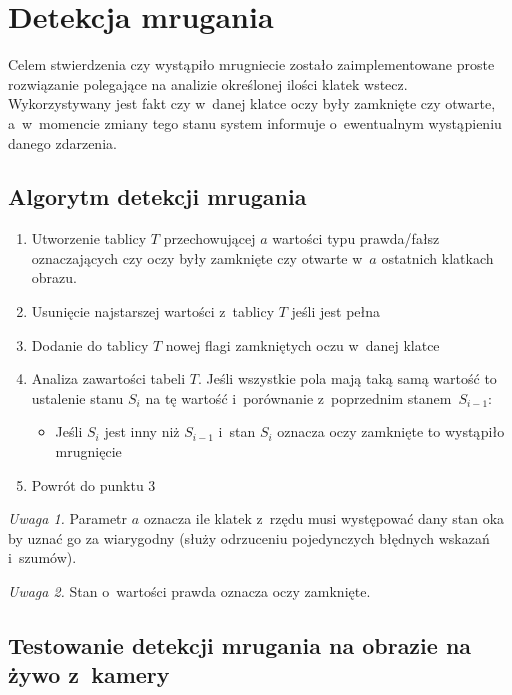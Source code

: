 \newpage

\section{Detekcja mrugania}

Celem stwierdzenia czy wystąpiło mrugniecie zostało zaimplementowane proste rozwiązanie polegające na analizie określonej ilości klatek wstecz. Wykorzystywany jest fakt czy w~danej klatce oczy były zamknięte czy otwarte, a~w~momencie zmiany tego stanu system informuje o~ewentualnym wystąpieniu danego zdarzenia. 

\subsection{Algorytm detekcji mrugania}

\begin{enumerate}
    \item Utworzenie tablicy $T$ przechowującej $a$ wartości typu prawda/fałsz oznaczających czy oczy były zamknięte czy otwarte w~$a$ ostatnich klatkach obrazu.
    \item Usunięcie najstarszej wartości z~tablicy $T$ jeśli jest pełna
    \item Dodanie do tablicy $T$ nowej flagi zamkniętych oczu w~danej klatce
    \item Analiza zawartości tabeli $T$. Jeśli wszystkie pola mają taką samą wartość to ustalenie stanu $S_{i}$ na tę wartość i~porównanie z~poprzednim stanem~$S_{i-1}$:
        \begin{itemize}
            \item Jeśli $S_{i}$ jest inny niż $S_{i-1}$ i~stan $S_{i}$ oznacza oczy zamknięte to wystąpiło mrugnięcie
        \end{itemize}
    \item Powrót do punktu 3
\end{enumerate}

\vspace{3mm}

\textit{Uwaga 1.} Parametr $a$ oznacza ile klatek z~rzędu musi występować dany stan oka by uznać go za wiarygodny (służy odrzuceniu pojedynczych błędnych wskazań i~szumów).

\par

\textit{Uwaga 2.} Stan o~wartości prawda oznacza oczy zamknięte.



\subsection{Testowanie detekcji mrugania na obrazie na żywo z~kamery} \label{section:test_eye_blink}

